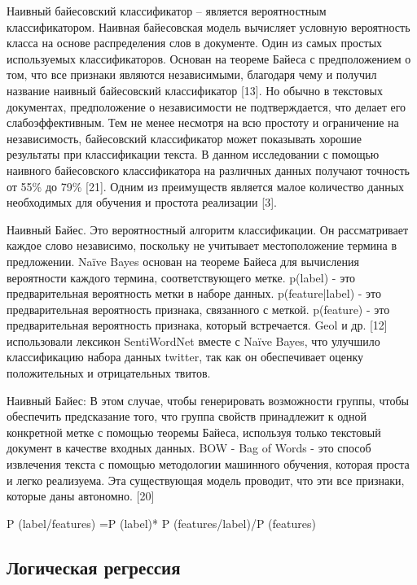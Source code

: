 Наивный байесовский классификатор – является вероятностным классификатором.
Наивная байесовская модель вычисляет условную вероятность класса на основе
распределения слов в документе. Один из самых простых используемых
классификаторов. Основан на теореме Байеса с предположением о том, что все
признаки являются независимыми, благодаря чему и получил название наивный
байесовский классификатор [13]. Но обычно в текстовых документах, предположение
о независимости не подтверждается, что делает его слабоэффективным. Тем не менее
несмотря на всю простоту и ограничение на независимость, байесовский
классификатор может показывать хорошие результаты при классификации текста. В
данном исследовании с помощью наивного байесовского классификатора на различных
данных получают точность от 55\% до 79\% [21]. Одним из преимуществ является
малое количество данных необходимых для обучения и простота реализации [3].
\cite{article9}

Наивный Байес. Это вероятностный алгоритм классификации. Он рассматривает каждое
слово независимо, поскольку не учитывает местоположение термина в предложении.
Naïve Bayes основан на теореме Байеса для вычисления вероятности каждого
термина, соответствующего метке. 
p(label) - это предварительная вероятность
метки в наборе данных. p(feature|label) - это предварительная вероятность
признака, связанного с меткой. p(feature) - это предварительная вероятность
признака, который встречается. Geol и др. [12] использовали лексикон
SentiWordNet вместе с Naïve Bayes, что улучшило классификацию набора данных
twitter, так как он обеспечивает оценку положительных и отрицательных твитов.
\cite{article16}

Наивный Байес: В этом случае, чтобы генерировать возможности группы, чтобы
обеспечить предсказание того, что группа свойств принадлежит к одной конкретной
метке с помощью теоремы Байеса, используя только текстовый документ в качестве
входных данных. BOW - Bag of Words - это способ извлечения текста с помощью
методологии машинного обучения, которая проста и легко реализуема. Эта
существующая модель проводит, что эти все признаки, которые даны автономно. [20]

P (label/features) =P (label)* P (features/label)/P (features)
\cite{article18}

\subsection{Логическая регрессия}

